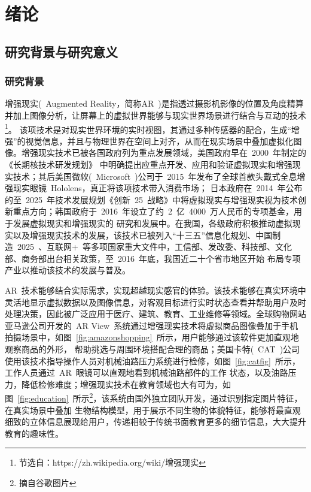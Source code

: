 \chapter{绪论}
\label{cha:intro}
\section{研究背景与研究意义}
\label{sec:backgroundandsignificance}
\subsection{研究背景}
\label{sec:research_background}
增强现实(~Augmented Reality，简称AR~)是指透过摄影机影像的位置及角度精算并加上图像分析，让屏幕上的虚拟世界能够与现实世界场景进行结合与互动的技术\footnote{节选自：https://zh.wikipedia.org/wiki/增强现实}。
该项技术是对现实世界环境的实时视图，其通过多种传感器的配合，生成“增强”的视觉信息，并且与物理世界在空间上对齐，从而在现实场景中叠加虚拟化图像。增强现实技术已被各国政府列为重点发展领域，美国政府早在~2000~年制定的《长期核技术研发规划》
中明确提出应重点开发、应用和验证虚拟现实和增强现实技术；其后美国微软(~Microsoft~)公司于~2015~年发布了全球首款头戴式全息增强现实眼镜~Hololens，真正将该项技术带入消费市场；
日本政府在~2014~年公布的至~2025~年技术发展规划《创新~25~战略》中将虚拟现实与增强现实视为技术创新重点方向；韩国政府于~2016~年设立了约~2~亿~4000~万人民币的专项基金，用于发展虚拟现实和增强现实的
研究和发展中。在我国，各级政府积极推动虚拟现实以及增强现实技术的发展，该技术已被列入“十三五”信息化规划、中国制造~2025~、互联网+~等多项国家重大文件中，工信部、发改委、科技部、文化部、商务部出台相关政策，至~2016~年底，我国近二十个省市地区开始
布局专项产业以推动该技术的发展与普及\cite{ZhongguoxinxitongxinyanjiuyuanXuNiZengQiangXianShiBaiPiShu2017}。

AR~技术能够结合实际需求，实现超越现实感官的体验。该技术能够在真实环境中灵活地显示虚拟数据以及图像信息，对客观目标进行实时状态查看并帮助用户及时
处理决策，因此被广泛应用于医疗、建筑、教育、工业维修等领域。全球购物网站亚马逊公司开发的~AR View~系统通过增强现实技术将虚拟商品图像叠加于手机拍摄场景中，如图~\ref{fig:amazonshopping}~所示，用户能够通过该软件更加直观地观察商品的外形，
帮助挑选与周围环境搭配合理的商品；美国卡特(~CAT~)公司使用该技术指导操作人员对机械油路压力系统进行检修，如图~\ref{fig:catfig}~所示，工作人员通过~AR~眼镜可以直观地看到机械油路部件的工作
状态，以及油路压力，降低检修难度；增强现实技术在教育领域也大有可为，如图~\ref{fig:education}~所示\footnote{摘自谷歌图片}，该系统由国外独立团队开发，通过识别指定图片特征，在真实场景中叠加
生物结构模型，用于展示不同生物的体貌特征，能够将最直观细致的立体信息展现给用户，传递相较于传统书面教育更多的细节信息，大大提升教育的趣味性。


